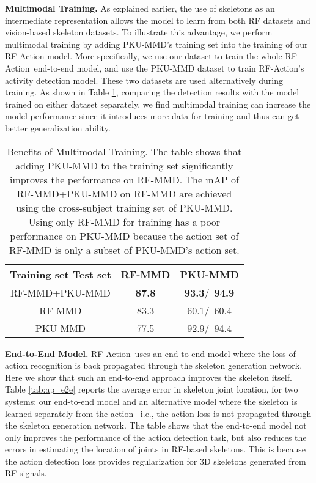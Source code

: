 \documentclass[10pt,twocolumn,letterpaper]{article}
\newcommand{\name} {RF-Action}
\begin{document}
\vskip  0.06in \noindent
\textbf{Multimodal Training.}
As explained earlier, the use of skeletons as an intermediate representation allows the model to learn from both RF datasets and vision-based skeleton datasets. To illustrate this advantage, we perform multimodal training by adding PKU-MMD's training set into the training of our RF-Action model. More specifically, we use our dataset to train the whole \name\ end-to-end model, and use the PKU-MMD dataset to train \name's activity detection model. These two datasets are used alternatively during training. As shown in Table \ref{tab:ap_joint}, comparing the detection results with the model trained on either dataset separately, we find multimodal training can increase the model performance since it introduces more data for training and thus can get better generalization ability. 

\begin{table}[htbp]
  \small
    \centering
    \vspace{-5pt}
    \begin{tabular}{ccc}
        \hline
        Training set  Test set & RF-MMD & PKU-MMD \\
        \hline
        RF-MMD+PKU-MMD & \textbf{87.8} & \textbf{93.3}/~\textbf{94.9} \\
        RF-MMD & 83.3 & 60.1/~60.4 \\
        PKU-MMD & 77.5 & 92.9/~94.4 \\
        \hline
    \end{tabular}
  \vspace{-10pt}
    \caption{\footnotesize{Benefits of Multimodal Training. The table shows that adding PKU-MMD to the training set significantly improves the performance on RF-MMD. The mAP of RF-MMD+PKU-MMD on RF-MMD are achieved using the cross-subject training set of PKU-MMD. Using only RF-MMD for training has a poor performance on PKU-MMD because the action set of RF-MMD is only a subset of PKU-MMD's action set.}}
  \vspace{-5pt}
  \label{tab:ap_joint}
\end{table}

\vskip  0.06in \noindent
\textbf{End-to-End Model.}
\name\ uses an end-to-end model where the loss of action recognition is back propagated through the skeleton generation network. Here we show that such an end-to-end approach improves the skeleton itself. Table \ref{tab:ap_e2e} reports the average error in skeleton joint location, for two systems: our end-to-end model and an alternative model where the skeleton is learned separately from the action --i.e., the action loss is not propagated through the skeleton generation network. The table shows that the end-to-end model not only improves the performance of the action detection task, but also reduces the errors in estimating the location of joints in RF-based skeletons. This is because the action detection loss provides regularization for 3D skeletons generated from RF signals. 
\end{document}
